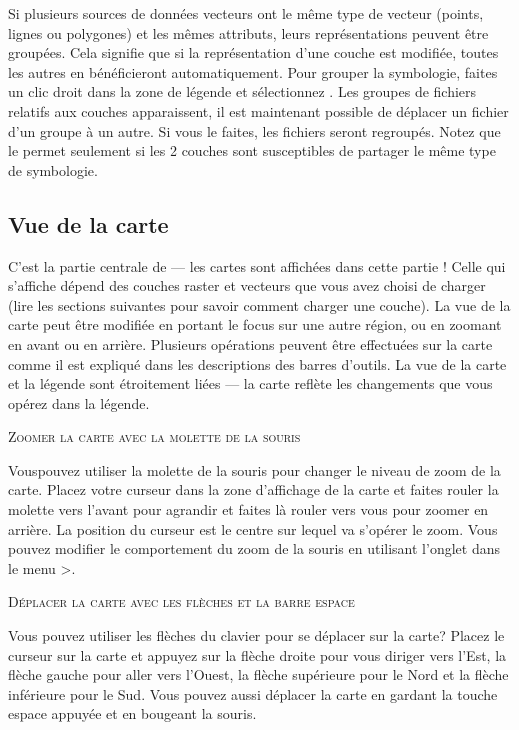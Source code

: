 Si plusieurs sources de données vecteurs ont le même type de vecteur (points, lignes ou polygones) et les mêmes attributs, leurs représentations peuvent être groupées. Cela signifie que si la représentation d'une couche est modifiée, toutes les autres en bénéficieront automatiquement. Pour grouper la symbologie, faites un clic droit dans la zone de légende et sélectionnez . Les groupes de fichiers relatifs aux couches apparaissent, il est maintenant possible de déplacer un fichier d'un groupe à un autre. Si vous le faites, les fichiers seront regroupés. Notez que \qg le permet seulement si les 2 couches sont susceptibles de partager le même type de symbologie.

\subsection{Vue de la carte}\label{label_mapview}

C'est la partie centrale de \qg — les cartes sont affichées dans cette partie ! Celle qui s'affiche dépend des couches raster et vecteurs que vous avez choisi de charger (lire les sections suivantes pour savoir comment charger une couche). La vue de la carte peut être modifiée en portant le focus sur une autre région, ou en zoomant en avant ou en arrière. Plusieurs opérations peuvent être effectuées sur la carte comme il est expliqué dans les descriptions des barres d'outils. La vue de la carte et la légende sont étroitement liées — la carte reflète les changements que vous opérez dans la légende.

\begin{Tip}\caption{\textsc{Zoomer la carte avec la molette de la souris}}
Vouspouvez utiliser la molette de la souris pour changer le niveau de zoom de la carte. Placez votre curseur dans la zone d'affichage de la carte et faites rouler la molette vers l'avant pour agrandir et faites là rouler vers vous pour zoomer en arrière. La position du curseur est le centre sur lequel va s'opérer le zoom. Vous pouvez modifier le comportement du zoom de la souris en utilisant l'onglet  dans le menu  >.
\end{Tip}

\begin{Tip}\caption{\textsc{Déplacer la carte avec les flèches et la barre espace}}
Vous pouvez utiliser les flèches du clavier pour se déplacer sur la carte? Placez le curseur sur la carte et appuyez sur la flèche droite pour vous diriger vers l'Est, la flèche gauche pour aller vers l'Ouest, la flèche supérieure pour le Nord et la flèche inférieure pour le Sud. Vous pouvez aussi déplacer la carte en gardant la touche espace appuyée et en bougeant la souris.
\end{Tip}

